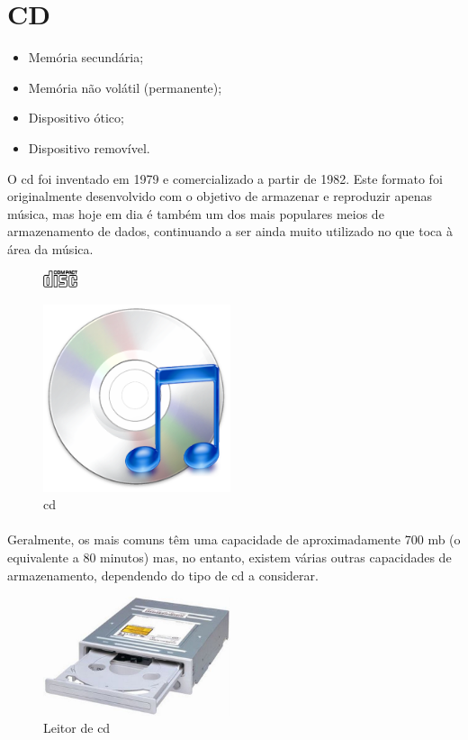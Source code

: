 \documentclass[a4paper]{report}
\begin{document}
\section{CD}
\label{sect.cd}

\begin{itemize}
\item Memória secundária;
\item Memória não volátil (permanente);
\item Dispositivo ótico;
\item Dispositivo removível.
\end{itemize}

O \ac{cd} foi inventado em 1979 e comercializado a partir de 1982. Este formato foi originalmente desenvolvido com o objetivo de armazenar e reproduzir apenas música, mas hoje em dia é também um dos mais populares meios de armazenamento de dados, continuando a ser ainda muito utilizado no que toca à área da música. 

\begin{figure}[H]
\center
\includegraphics[width=1cm]{Imagens/cd_logo.png}
\end{figure}

\begin{figure}[H]
\center
\includegraphics[width=5.5cm]{Imagens/cd.png}
\caption{\ac{cd}}
\end{figure}

\paragraph*{}Geralmente, os mais comuns têm uma capacidade de aproximadamente 700 \ac{mb} (o equivalente a 80 minutos) mas, no entanto, existem várias outras capacidades de armazenamento, dependendo do tipo de \ac{cd} a considerar.

\begin{figure}[H]
\center
\includegraphics[width=5.5cm]{Imagens/leitor_cd.jpeg}
\caption{Leitor de \ac{cd}}
\end{figure}
\end{document}
